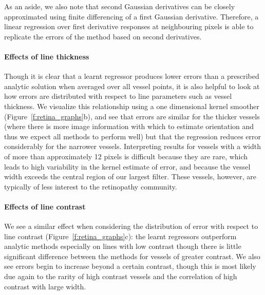 \documentclass[runningheads,a4paper]{llncs}
\newcommand{\fref}[1]{Figure~\ref{#1}}
\begin{document}
As an aside, we also note that second Gaussian derivatives can be closely approximated using finite differencing of a first Gaussian derivative. Therefore, a linear regression over first derivative responses at neighbouring pixels is able to replicate the errors of the method based on second derivatives.

\paragraph{Effects of line thickness}
Though it is clear that a learnt regressor produces lower errors than a prescribed analytic solution when averaged over all vessel points, it is also helpful to look at how errors are distributed with respect to line parameters such as vessel thickness. We visualize this relationship using a one dimensional kernel smoother (\fref{f:retina_graphs}b), and see that errors are similar for the thicker vessels (where there is more image information with which to estimate orientation and thus we expect all methods to perform well) but that the regression reduces error considerably for the narrower vessels. Interpreting results for vessels with a width of more than approximately 12 pixels is difficult because they are rare, which leads to high variability in the kernel estimate of error, and because the vessel width exceeds the central region of our largest filter. These vessels, however, are typically of less interest to the retinopathy community.

\paragraph{Effects of line contrast}
We see a similar effect when considering the distribution of error with respect to line contrast (\fref{f:retina_graphs}c): the learnt regressors outperform analytic methods especially on lines with low contrast though there is little significant difference between the methods for vessels of greater contrast. We also see errors begin to increase beyond a certain contrast, though this is most likely due again to the rarity of high contrast vessels and the correlation of high contrast with large width.
\end{document}
